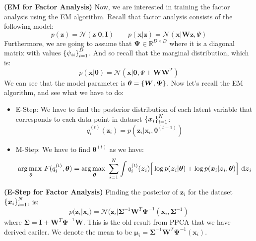 \begin{remark}{\textbf{(EM for Factor Analysis)}}
    Now, we are interested in training the factor analysis using the EM algorithm. Recall that factor analysis consists of the following model:
    \begin{equation*}
        p(\boldsymbol z) = \mathcal{N}(\boldsymbol z | \boldsymbol 0,\boldsymbol  I) \qquad p(\boldsymbol x|\boldsymbol z) = \mathcal{N}(\boldsymbol x | \boldsymbol W\boldsymbol z, \Psi)
    \end{equation*}
    Furthermore, we are going to assume that $\boldsymbol\Psi \in \mathbb{R}^{D\times D}$ where it is a diagonal matrix with values $\left\{ \psi_{ii} \right\}^D_{i=1}$. And so recall that the marginal distribution, which is:
    \begin{equation*}
        p(\boldsymbol x | \boldsymbol \theta) = \mathcal{N}(\boldsymbol x | \boldsymbol 0, \Psi + \boldsymbol W\boldsymbol W^T)
    \end{equation*}
    We can see that the model parameter is $\boldsymbol \theta = \left\{ \boldsymbol W, \boldsymbol \Psi \right\}$. Now let's recall the EM algorithm, and see what we have to do:
    \begin{itemize}
        \item E-Step: We have to find the posterior distribution of each latent variable that corresponds to each data point in dataset $\left\{ \boldsymbol x_i \right\}^N_{i=1}$:
        \begin{equation*}
            q_i^{(t)}(\boldsymbol z_i) = p(\boldsymbol z_i | \boldsymbol x_i, \boldsymbol \theta^{(t-1)})
        \end{equation*}
        \item M-Step: We have to find $\boldsymbol \theta^{(t)}$ as we have:
        \begin{equation*}
        \begin{aligned} 
            \underset{\boldsymbol \theta}{\arg\max \ } F(q^{(t)}_i, \boldsymbol \theta) = \underset{\boldsymbol \theta}{\arg\max \ } \sum_{i=1}^N \int q_i^{(t)}(\boldsymbol z_i) \Big[ \log p(\boldsymbol z_i|\boldsymbol \theta) + \log p(\boldsymbol x_i | \boldsymbol z_i, \boldsymbol \theta) \Big]\ \mathrm{d} \boldsymbol z_i
        \end{aligned}
        \end{equation*}
    \end{itemize}
\end{remark}

\begin{proposition}{\textbf{(E-Step for Factor Analysis)}}
    Finding the posterior of $\boldsymbol z_i$ for the dataset $\left\{ \boldsymbol x_i \right\}^N_{i=1}$, is:
    \begin{equation*}
        p(\boldsymbol z_i | \boldsymbol x_i) = \mathcal{N}(\boldsymbol z_i | \boldsymbol \Sigma^{-1}\boldsymbol W^T\boldsymbol \Psi^{-1}(\boldsymbol x_i, \boldsymbol \Sigma^{-1})
    \end{equation*}
    where $\boldsymbol \Sigma = \boldsymbol I + \boldsymbol W^T\boldsymbol \Psi^{-1}\boldsymbol W$. This is the old result from PPCA that we have derived eariler. We denote the mean to be $\boldsymbol \mu_i = \boldsymbol \Sigma^{-1}\boldsymbol W^T\boldsymbol \Psi^{-1}(\boldsymbol x_i)$.
\end{proposition}

